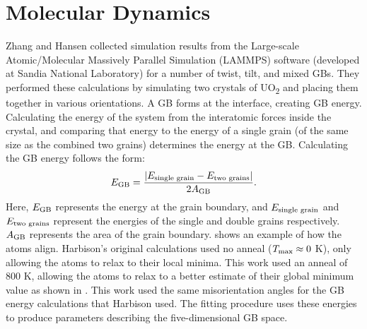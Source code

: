 \documentclass[twoside,senior]{BYUPhys}
\begin{document}
\section{Molecular Dynamics\label{methods:MD}}
Zhang\cite{zhang2016} and Hansen\cite{hansen2016} collected simulation results from the Large-scale Atomic/Molecular Massively Parallel Simulation (LAMMPS) software (developed at Sandia National Laboratory\cite{plimpton1995}) for a number of twist, tilt, and mixed GBs.  They performed these calculations by simulating two crystals of UO\textsubscript{2} and placing them together in various orientations.  A GB forms at the interface, creating GB energy.  Calculating the energy of the system from the interatomic forces inside the crystal, and comparing that energy to the energy of a single grain (of the same size as the combined two grains) determines the energy at the GB.\cite{harbison2015}  Calculating the GB energy follows the form:\cite{butterfield2013}
\begin{equation}\label{eq:GBE}
E_{\textnormal{GB}}=\frac{|E_{\textnormal{single grain}} - E_{\textnormal{two grains}}|}{2A_{\textnormal{GB}}}.
\end{equation} 
Here, $E_{\textnormal{GB}}$ represents the energy at the grain boundary, and $E_{\textnormal{single grain}}$ and $E_{\textnormal{two grains}}$ represent the energies of the single and double grains respectively.  $A_{\textnormal{GB}}$ represents the area of the grain boundary.   shows an example of how the atoms align. Harbison's original calculations\cite{harbison2015} used no anneal ($T_{\textnormal{max}}\approx0$ K), only allowing the atoms to relax to their local minima.  This work used an anneal of 800 K, allowing the atoms to relax to a better estimate of their global minimum value as shown in .  This work used the same misorientation angles for the GB energy calculations that Harbison used.  The fitting procedure uses these energies to produce parameters describing the five-dimensional GB space.
\end{document}

